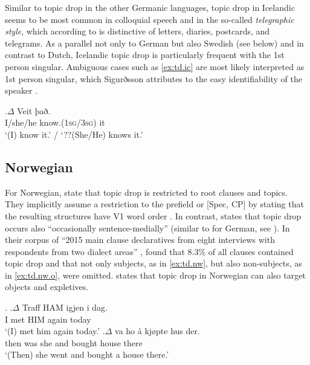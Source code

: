 Similar to topic drop in the other Germanic languages, topic drop in Icelandic seems to be most common in colloquial speech and in the so-called \textit{telegraphic style}, which according to \citet[139]{sigurdsson1989} is distinctive of letters, diaries, postcards, and telegrams.
As a parallel not only to German but also Swedish  (see below) and in contrast to Dutch,  Icelandic topic drop is particularly frequent with the 1st person singular.
Ambiguous  cases such as \ref{ex:td.ic} are most likely interpreted as 1st person singular, which Sigurðsson attributes to the easy identifiability of the speaker \citep[140]{sigurdsson1989}.

\exg.\label{ex:td.ic}$\Delta$ Veit það.\\
I/she/he know.(\textsc{1sg}/\textsc{3sg}) it\\
`(I) know it.' / `??(She/He) knows it.' \citep[140, his judgment]{sigurdsson1989}


\subsection{Norwegian} 
For Norwegian, \citet[333]{eide.sollid2011} state that topic drop is restricted to root clauses and topics.
They implicitly assume a restriction to the prefield or [Spec, CP] by stating that the resulting structures have V1 word order \citep[346]{eide.sollid2011}.
In contrast, \citet[10]{nygard2018} states that topic drop occurs also ``occasionally sentence-medially'' (similar to \cite{helmer2016} for German, see ).
In their corpus  of ``2015 main clause declaratives from eight interviews with respondents from two dialect areas'' \citep[342]{eide.sollid2011}, \citet[346]{eide.sollid2011} found that 8.3\% of all clauses contained topic drop and that not only subjects, as in \ref{ex:td.nw}, but also non-subjects, as in \ref{ex:td.nw.o}, were omitted.
\citet[172--173]{nygard2014} states that topic drop in Norwegian can also target objects and expletives. 

\ex.
\ag.\label{ex:td.nw}$\Delta$ Traff HAM igjen {i dag}.\\
I met HIM again today \\
`(I) met him again today.'  \citep[333, original emphasis]{eide.sollid2011}
\bg.\label{ex:td.nw.o}$\Delta$ va ho å kjøpte hus der.\\
then was she and bought house there \\
`(Then) she went and bought a house there.'  \citep[346]{eide.sollid2011}

